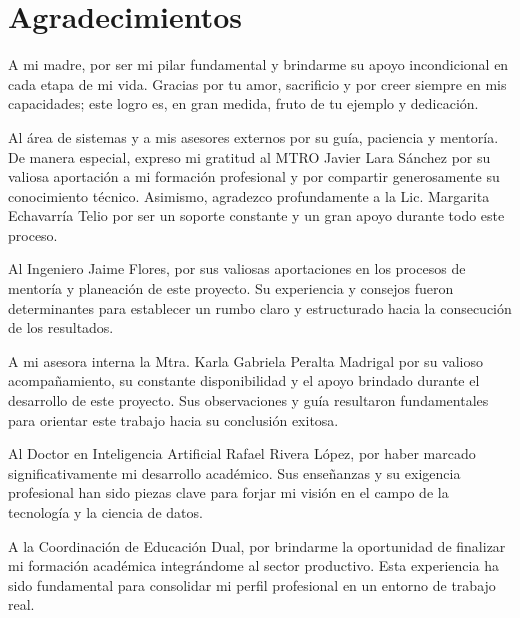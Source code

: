 \chapter*{Agradecimientos}

A mi madre, por ser mi pilar fundamental y brindarme su apoyo incondicional en cada etapa de mi vida. Gracias por tu amor, sacrificio y por creer siempre en mis capacidades; este logro es, en gran medida, fruto de tu ejemplo y dedicación.

Al área de sistemas y a mis asesores externos por su guía, paciencia y mentoría. De manera especial, expreso mi gratitud al MTRO Javier Lara Sánchez por su valiosa aportación a mi formación profesional y por compartir generosamente su conocimiento técnico. Asimismo, agradezco profundamente a la Lic. Margarita Echavarría Telio por ser un soporte constante y un gran apoyo durante todo este proceso.

Al Ingeniero Jaime Flores, por sus valiosas aportaciones en los procesos de mentoría y planeación de este proyecto. Su experiencia y consejos fueron determinantes para establecer un rumbo claro y estructurado hacia la consecución de los resultados.

A mi asesora interna la Mtra. Karla Gabriela Peralta Madrigal por su valioso acompañamiento, su constante disponibilidad y el apoyo brindado durante el desarrollo de este proyecto. Sus observaciones y guía resultaron fundamentales para orientar este trabajo hacia su conclusión exitosa.

Al Doctor en Inteligencia Artificial Rafael Rivera López, por haber marcado significativamente mi desarrollo académico. Sus enseñanzas y su exigencia profesional han sido piezas clave para forjar mi visión en el campo de la tecnología y la ciencia de datos.

A la Coordinación de Educación Dual, por brindarme la oportunidad de finalizar mi formación académica integrándome al sector productivo. Esta experiencia ha sido fundamental para consolidar mi perfil profesional en un entorno de trabajo real.
